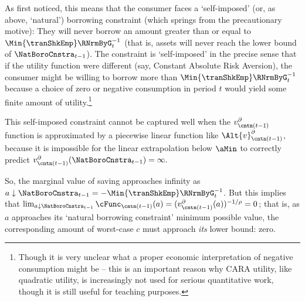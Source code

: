\documentclass[titlepage, headings=optiontotocandhead]{econark}
\begin{document}
{As \cite{zeldesStochastic} first noticed, this means that the consumer faces a `self-imposed' (or, as above, `natural') borrowing constraint (which springs from the precautionary motive): They will never borrow an amount greater than or equal to $\Min{\tranShkEmp}\RNrmByG_{t}^{-1}$ (that is, assets will never reach the lower bound of $\NatBoroCnstra_{t-1}$).  The constraint is `self-imposed' in the precise sense that if the utility function were different (say, Constant Absolute Risk Aversion), the consumer might be willing to borrow more than $\Min{\tranShkEmp}\RNrmByG_{t}^{-1}$ because a choice of zero or negative consumption in period $t$ would yield some finite amount of utility.\footnote{Though it is very unclear what a proper economic interpretation of negative consumption might be -- this is an important reason why CARA utility, like quadratic utility, is increasingly not used for serious quantitative work, though it is still useful for teaching purposes.}

This self-imposed constraint cannot be captured well when the $v^{\partial}_{{\cntn}(t-1)}$ function is approximated by a piecewise linear function like $\Alt{v}^{\partial}_{{\cntn}(t-1)}$, because it is impossible for the linear extrapolation below $\aMin$ to correctly predict $v^{\partial}_{{\cntn}(t-1)}(\NatBoroCnstra_{t-1})=\infty.$ %


So, the marginal value of saving approaches infinity as $a \downarrow \NatBoroCnstra_{t-1}=-\Min{\tranShkEmp}\RNrmByG_{t}^{-1}$.  But this implies that $\lim_{a \downarrow \NatBoroCnstra_{t-1}} \cFunc_{{\cntn}(t-1)}(a) = (v^{\partial}_{{\cntn}(t-1)}(a))^{-1/\rho} = 0$; that is, as $a$ approaches its `natural borrowing constraint' minimum possible value, the corresponding amount of worst-case $c$ must approach \textit{its} lower bound: zero.

}
\end{document}
